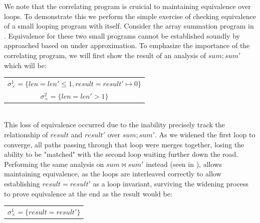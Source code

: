 We note that the correlating program is cruicial to maintaining equivalence over loops. To demonstrate this we perform the simple exercise of checking equivalence of a small looping program with itself. Consider the array summation program in . Equivalence for these two small programs cannot be established soundly by approached based on under approximation. To emphasize the importance of the correlating program, we will first show the result of an analysis of $sum;sum'$ which will be:
\\
\begin{tabular}{c}
\hspace{1cm} $\sigma_{\times}^1 = \{len = len' \leq 1, result = result' \mapsto 0\}$
\\
\hspace{1cm} $\sigma_{\times}^2 = \{len = len' > 1\}$
\end{tabular}
\\

This loss of equivalence occurred due to the inability precisely track the relationship of $result$ and $result'$ over $sum;sum'$. As we widened the first loop to converge, all paths passing through that loop were merges together, losing the ability to be "matched" with the second loop waiting further down the road. Performing the same analysis on $sum \bowtie sum'$ instead (seen in ), allows maintaining equivalence, as the loops are interleaved correctly to allow establishing $result = result'$ as a loop invariant, surviving the widening process to prove equivalence at the end as the result would be:
\\
\begin{tabular}{c}
\hspace{2cm} $\sigma_{\times}^1 = \{result = result'\}$
\end{tabular}
\\

